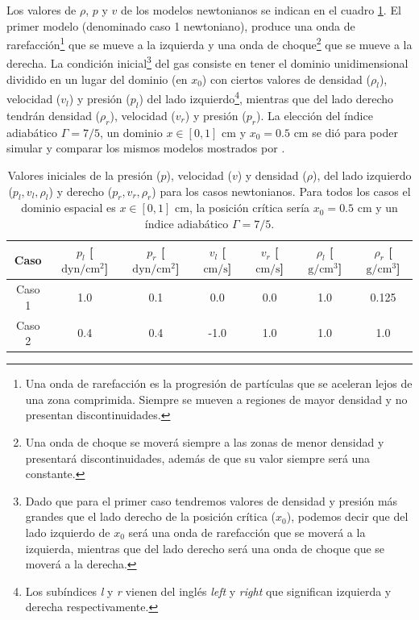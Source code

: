 \documentclass[12pt,a4paper]{book}
\begin{document}
Los valores de $\rho$, $p$ y $v$ de los modelos newtonianos se indican en el cuadro
\ref{Cuadro_parametros_sod_tube}. El primer  modelo (denominado caso 1 newtoniano), produce una onda 
de rarefacción\footnote{
  Una onda de rarefacción es la progresión de partículas que se aceleran lejos de una zona 
  comprimida. Siempre se mueven a regiones de mayor densidad y no presentan discontinuidades.
} que se mueve a la izquierda y una onda de choque\footnote{
  Una onda de choque se moverá siempre a las zonas de menor densidad y presentará discontinuidades, además
  de que su valor siempre será una constante.
} que se mueve a la derecha. La condición inicial\footnote{
  Dado que para el primer caso tendremos valores de densidad
  y presión más grandes que el lado derecho de la posición crítica ($x_0$), 
  podemos decir que del lado izquierdo 
  de $x_0$ será una onda de rarefacción que se moverá a la izquierda, mientras que del lado
  derecho será una onda de choque que se moverá a la derecha.
} del gas consiste en tener el dominio 
unidimensional dividido en un lugar del dominio (en $x_0$) con ciertos valores de densidad ($\rho_l$), 
velocidad ($v_l$) y presión ($p_l$) del lado izquierdo\footnote{Los subíndices \emph{l} y \emph{r} 
vienen del inglés \emph{left} y \emph{right} que significan izquierda y derecha respectivamente.}, 
mientras que del lado derecho tendrán densidad ($\rho_r$), velocidad ($v_r$) y  presión ($p_r$). 
La elección del índice adiabático $\Gamma = 7/5$, un dominio $x \in [0,1]$ cm y $x_0 = 0.5$ cm 
se dió para poder simular y comparar los mismos modelos
mostrados por \citet{Lora2013}.

\begin{table}[htbp]
  \begin{center}
  \begin{tabular}{|c|c|c|c|c|c|c|}
  \hline 
  \textbf{Caso} & \textbf{$p_l$} [$\text{dyn}/\text{cm}^2$] & \textbf{$p_r$} [$\text{dyn}/\text{cm}^2$]& \textbf{$v_l$} [$\text{cm}/\text{s}$]& \textbf{$v_r$} [$\text{cm}/\text{s}$]& \textbf{$\rho_l$} [$\text{g}/\text{cm}^3$]& \textbf{$\rho_r$} [$\text{g}/\text{cm}^3$] \\ 
  \hline 
  Caso 1 & 1.0  & 0.1  & 0.0 & 0.0 & 1.0  & 0.125 \\ 
  \hline 
  Caso 2 & 0.4  & 0.4  & -1.0 & 1.0 & 1.0  & 1.0  \\ 
  \hline 
  \end{tabular}
  \caption{\label{Cuadro_parametros_sod_tube} Valores iniciales de la presión ($p$), velocidad ($v$)
  y densidad ($\rho$), del lado izquierdo ($p_l, v_l, \rho_l$) y derecho ($p_r, v_r, \rho_r$)
  para los casos newtonianos. Para todos los
  casos el dominio espacial es $x \in [0,1]$ cm, la posición crítica sería
  $x_0 = 0.5$ cm y un índice adiabático $\Gamma = 7/5$.}
  \end{center}
\end{table}
\end{document}
